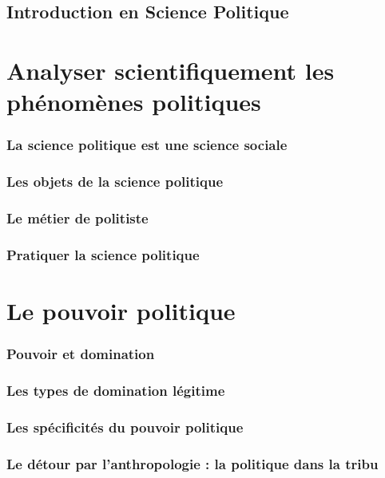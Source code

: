 \chapter{Introduction en Science Politique}

\part{Analyser scientifiquement les phénomènes politiques}

	\section{La science politique est une science sociale}

	\section{Les objets de la science politique}

	\section{Le métier de politiste}

	\section{Pratiquer la science politique}
	

\part{Le pouvoir politique}

	\section{Pouvoir et domination}
	
	\section{Les types de domination légitime}
	
	\section{Les spécificités du pouvoir politique}
	
	\section{Le détour par l'anthropologie : la politique dans la tribu}

